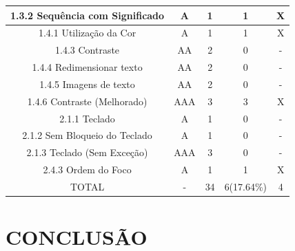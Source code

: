 \documentclass[a4paper]{article}
\begin{document}
\begin{titlepage}
\begin{center}
\begin{longtable}{|c|c|c|c|c|}
		\hline
		1.3.2 Sequência com Significado & A & 1 & 1 & X \\
		\hline
		1.4.1 Utilização da Cor & A & 1 & 1 & X \\
		\hline
		1.4.3 Contraste & AA & 2 & 0 & - \\
		\hline
		1.4.4 Redimensionar texto & AA & 2 & 0 & - \\
		\hline
		1.4.5 Imagens de texto & AA & 2 & 0 & - \\
		\hline
		1.4.6 Contraste (Melhorado) & AAA & 3 & 3 & X \\
		\hline
		2.1.1 Teclado & A & 1 & 0 & - \\
		\hline
		2.1.2 Sem Bloqueio do Teclado & A & 1 & 0 & - \\
		\hline
		2.1.3 Teclado (Sem Exceção) & AAA & 3 & 0 & - \\
		\hline
		2.4.3 Ordem do Foco & A & 1 & 1 & X \\
		\hline
		TOTAL & - & 34 & 6(17.64\%) & 4 \\
		\hline
	\end{longtable}
\end{center}

\section{CONCLUSÃO}


\end{titlepage}
\end{document}
